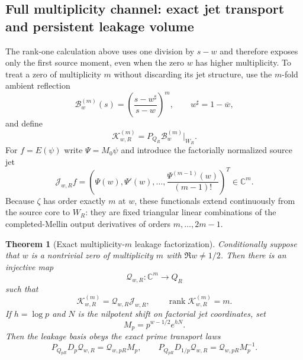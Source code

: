 \documentclass[11pt]{article}
\newtheorem{theorem}{Theorem}[section]
\theoremstyle{remark}
\begin{document}
\subsection{Full multiplicity channel: exact jet transport and persistent leakage volume}
The rank-one calculation above uses one division by $s-w$ and therefore exposes only the first source moment, even when the zero $w$ has higher multiplicity.  To treat a zero of multiplicity $m$ without discarding its jet structure, use the $m$-fold ambient reflection
\[
 \mathcal B_w^{(m)}(s)=\left(\frac{s-w^\sharp}{s-w}\right)^m,
 \qquad w^\sharp=1-\overline w,
\]
and define
\[
 \mathcal K_{w,R}^{(m)}=P_{Q_R}\mathcal B_w^{(m)}\big|_{W_R}.
\]
For $f=E(\psi)$ write $\Psi=M_0\psi$ and introduce the factorially normalized source jet
\[
 \mathcal J_{w,R}f=
 \left(\Psi(w),\Psi'(w),\ldots,\frac{\Psi^{(m-1)}(w)}{(m-1)!}\right)^T\in\mathbb C^m.
\]
Because $\zeta$ has order exactly $m$ at $w$, these functionals extend continuously from the source core to $W_R$: they are fixed triangular linear combinations of the completed-Mellin output derivatives of orders $m,\ldots,2m-1$.

\begin{theorem}[Exact multiplicity-$m$ leakage factorization]\label{thm:mleak}
Conditionally suppose that $w$ is a nontrivial zero of multiplicity $m$ with $\Re w\ne1/2$.  Then there is an injective map
\[
 \mathcal Q_{w,R}:\mathbb C^m\longrightarrow Q_R
\]
such that
\begin{equation}\label{eq:mfactor}
 \mathcal K_{w,R}^{(m)}=\mathcal Q_{w,R}\mathcal J_{w,R},
 \qquad
 \operatorname{rank}\mathcal K_{w,R}^{(m)}=m.
\end{equation}
If $h=\log p$ and $N$ is the nilpotent shift on factorial jet coordinates, set
\[
 M_p=p^{w-1/2}e^{hN}.
\]
Then the leakage basis obeys the exact prime transport laws
\begin{equation}\label{eq:mtransport}
 P_{Q_{pR}}D_p\mathcal Q_{w,R}=\mathcal Q_{w,pR}M_p,
 \qquad
 P_{Q_{pR}}D_{1/p}\mathcal Q_{w,R}=\mathcal Q_{w,pR}M_p^{-1}.
\end{equation}
\end{theorem}
\end{document}
